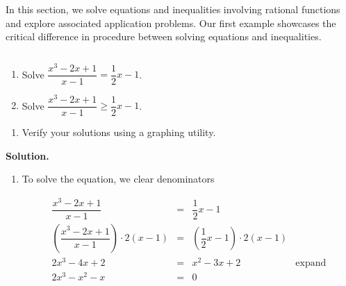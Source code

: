\documentclass{ximera}
\begin{document}
	\author{Stitz-Zeager}



\setcounter{footnote}{0}

\label{RationalIneq}

In this section, we solve equations and inequalities involving rational functions and explore associated application problems. Our first example showcases the critical difference in procedure between solving equations and inequalities.

\begin{example} \label{rationalinequalityex}  $~$

\begin{multicols}{2}
\begin{enumerate}

\item  Solve $\dfrac{x^3-2x+1}{x-1} = \dfrac{1}{2}x-1$.

\item  Solve $\dfrac{x^3-2x+1}{x-1} \geq \dfrac{1}{2}x-1$.

\setcounter{HW}{\value{enumi}}
\end{enumerate}
\end{multicols}

\begin{enumerate}
\setcounter{enumi}{\value{HW}}

\item  Verify your solutions using a graphing utility.

\end{enumerate}

{ \bf Solution.} 

\begin{enumerate}

\item  To solve the equation, we clear denominators

\[ \begin{array}{rclr}

\dfrac{x^3-2x+1}{x-1} & = & \dfrac{1}{2}x-1 & \\ [10pt]

\left(\dfrac{x^3-2x+1}{x-1}\right) \cdot 2(x-1) & = & \left( \dfrac{1}{2}x-1 \right) \cdot 2(x-1) & \\ [10pt]

2x^3 - 4x + 2 & = & x^2-3x+2 & \text{expand} \\

2x^3 -x^2 - x & = & 0 & \\


\end{array}\]
\end{enumerate}
\end{example}
\end{document}
